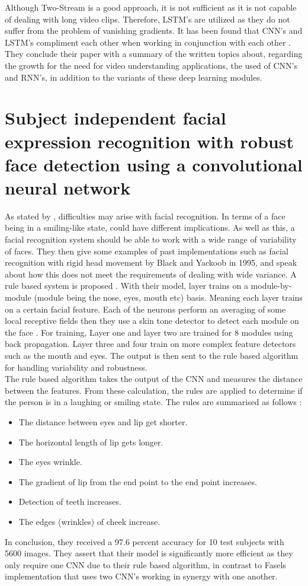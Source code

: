 Although Two-Stream is a good approach, it is not sufficient as it is not capable of dealing with long video clips. Therefore, LSTM's are utilized as they do not suffer from the problem of vanishing gradients. It has been found that CNN's and LSTM's compliment each other when working in conjunction with each other \citep{Wu}. They conclude their paper with a summary of the written topics about, regarding the growth for the need for video understanding applications, the used of CNN's and RNN's, in addition to the variants of these deep learning modules. 

\section{Subject independent facial expression recognition with robust face detection using a convolutional neural network}
As stated by \citeauthor{MATSUGU}, difficulties may arise with facial recognition. In terms of a face being in a smiling-like state, could have different implications. As well as this, a facial recognition system should be able to work with a wide range of variability of faces. They then give some examples of past implementations such as facial recognition with rigid head movement by Black and Yackoob in 1995, and speak about how this does not meet the requirements of dealing with wide variance. A rule based system is proposed \citep{MATSUGU}. With their model, layer trains on a module-by-module (module being the nose, eyes, mouth etc) basis. Meaning each layer trains on a certain facial feature. Each of the neurons perform an averaging of some local receptive fields then they use a skin tone detector to detect each module on the face \citep{MATSUGU}. For training, Layer one and layer two are trained for 8 modules using back propagation. Layer three and four train on more complex feature detectors such as the mouth and eyes. The output is then sent to the rule based algorithm for handling variability and robustness. \\
The rule based algorithm takes the output of the CNN and measures the distance between the features. From these calculation, the rules are applied to determine if the person is in a laughing or smiling state. The rules are summarised as follows \citep{MATSUGU}:
\begin{itemize}
	\item The distance between eyes and lip get shorter.
	\item The horizontal length of lip gets longer.
	\item The eyes wrinkle.
	\item The gradient of lip from the end point to the end point increases.
	\item Detection of teeth increases.
	\item The edges (wrinkles) of cheek increase.
\end{itemize}
In conclusion, they received a 97.6 percent accuracy for 10 test subjects with 5600 images. They assert that their model is significantly more efficient as they only require one CNN due to their rule based algorithm, in contrast to Fasels implementation that uses two CNN's working in synergy with one another.

